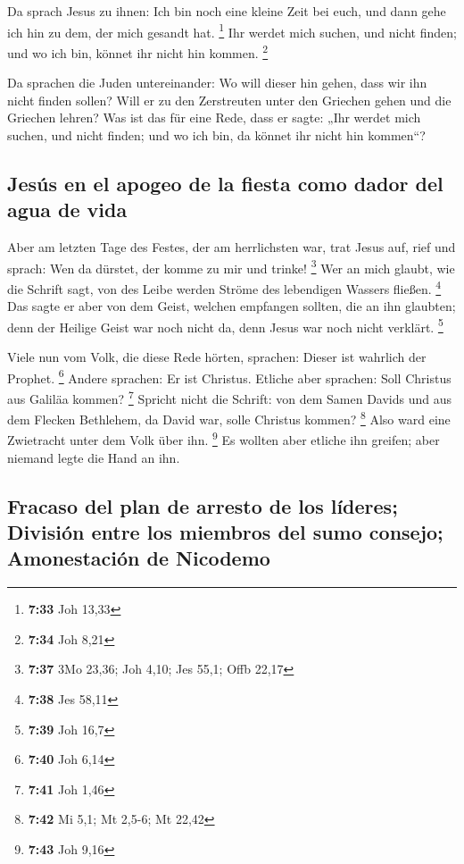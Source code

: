  Da sprach Jesus zu ihnen: Ich bin noch eine kleine Zeit
bei euch, und dann gehe ich hin zu dem, der mich gesandt hat.
\footnote{\textbf{7:33} Joh 13,33}  Ihr werdet mich
suchen, und nicht finden; und wo ich bin, könnet ihr nicht hin kommen.
\footnote{\textbf{7:34} Joh 8,21}

 Da sprachen die Juden untereinander: Wo will dieser hin
gehen, dass wir ihn nicht finden sollen? Will er zu den Zerstreuten
unter den Griechen gehen und die Griechen lehren?  Was
ist das für eine Rede, dass er sagte: „Ihr werdet mich suchen, und nicht
finden; und wo ich bin, da könnet ihr nicht hin kommen``?

\hypertarget{jesuxfas-en-el-apogeo-de-la-fiesta-como-dador-del-agua-de-vida}{%
\subsection{Jesús en el apogeo de la fiesta como dador del agua de
vida}\label{jesuxfas-en-el-apogeo-de-la-fiesta-como-dador-del-agua-de-vida}}

 Aber am letzten Tage des Festes, der am herrlichsten
war, trat Jesus auf, rief und sprach: Wen da dürstet, der komme zu mir
und trinke! \footnote{\textbf{7:37} 3Mo 23,36; Joh 4,10; Jes 55,1; Offb
  22,17}  Wer an mich glaubt, wie die Schrift sagt, von
des Leibe werden Ströme des lebendigen Wassers fließen. \footnote{\textbf{7:38}
  Jes 58,11}  Das sagte er aber von dem Geist, welchen
empfangen sollten, die an ihn glaubten; denn der Heilige Geist war noch
nicht da, denn Jesus war noch nicht verklärt. \footnote{\textbf{7:39}
  Joh 16,7}

 Viele nun vom Volk, die diese Rede hörten, sprachen:
Dieser ist wahrlich der Prophet. \footnote{\textbf{7:40} Joh 6,14}
 Andere sprachen: Er ist Christus. Etliche aber sprachen:
Soll Christus aus Galiläa kommen? \footnote{\textbf{7:41} Joh 1,46}
 Spricht nicht die Schrift: von dem Samen Davids und aus
dem Flecken Bethlehem, da David war, solle Christus kommen? \footnote{\textbf{7:42}
  Mi 5,1; Mt 2,5-6; Mt 22,42}  Also ward eine Zwietracht
unter dem Volk über ihn. \footnote{\textbf{7:43} Joh 9,16}
 Es wollten aber etliche ihn greifen; aber niemand legte
die Hand an ihn.

\hypertarget{fracaso-del-plan-de-arresto-de-los-luxedderes-divisiuxf3n-entre-los-miembros-del-sumo-consejo-amonestaciuxf3n-de-nicodemo}{%
\subsection{Fracaso del plan de arresto de los líderes; División entre
los miembros del sumo consejo; Amonestación de
Nicodemo}\label{fracaso-del-plan-de-arresto-de-los-luxedderes-divisiuxf3n-entre-los-miembros-del-sumo-consejo-amonestaciuxf3n-de-nicodemo}}

